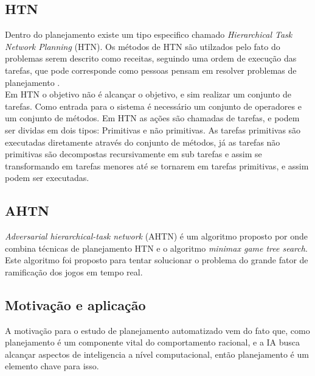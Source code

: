 \subsection{HTN} 
Dentro do planejamento existe um tipo especifico chamado \textit{Hierarchical Task Network Planning} (HTN). Os métodos de HTN são utilzados pelo fato do problemas serem descrito como receitas, seguindo uma ordem de execução das tarefas, que pode corresponde como pessoas pensam em resolver problemas de planejamento \cite{ghallab2004automated}.  \\
Em HTN o objetivo não é alcançar o objetivo, e sim realizar um conjunto de tarefas. Como entrada para o sistema é necessário um conjunto de operadores e um conjunto de métodos. Em HTN as ações são chamadas de tarefas, e podem ser dividas em dois tipos: Primitivas e não primitivas. As tarefas primitivas são executadas diretamente através do conjunto de métodos, já as tarefas não primitivas são decompostas recursivamente em sub tarefas e assim se transformando em tarefas menores até se tornarem em tarefas primitivas, e assim podem ser executadas. \\ 


\subsection{AHTN} 

\textit{Adversarial hierarchical-task network} (AHTN) é um algoritmo proposto por \cite{ontanon2015adversarial} onde combina técnicas de planejamento HTN e o algoritmo \textit{minimax game tree search}. Este algoritmo foi proposto para tentar solucionar o problema do grande fator de ramificação dos jogos em tempo real. \\

\subsection{Motivação e aplicação}
A motivação para o estudo de planejamento automatizado vem do fato que, como planejamento é um componente vital do comportamento racional, e a IA busca alcançar aspectos de inteligencia a nível computacional, então planejamento é um elemento chave para isso\cite{ghallab2004automated}.

